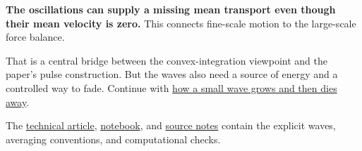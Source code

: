 \documentclass[
  english,
  11pt,
]{article}
\begin{document}
\textbf{The oscillations can supply a missing mean transport even though
their mean velocity is zero.} This connects fine-scale motion to the
large-scale force balance.

That is a central bridge between the convex-integration viewpoint and
the paper's pulse construction. But the waves also need a source of
energy and a controlled way to fade. Continue with
\href{../d5_shearing_wave/article.html}{how a small wave grows and then
dies away}.

The \href{technical-article.html}{technical article},
\href{../../code/d4_mean_stress/study.ipynb}{notebook}, and
\href{source-notes.md}{source notes} contain the explicit waves,
averaging conventions, and computational checks.
\end{document}
